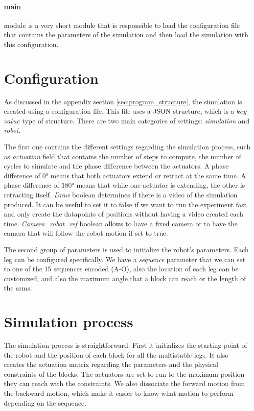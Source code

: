         \paragraph{main}
            module is a very short module that is responsible to load the configuration file that contains the parameters of the simulation and then load the simulation with this configuration.

    \section{Configuration}\label{sec:config}
        As discussed in the appendix section \ref{sec:program_structure}, the simulation is created using a configuration file. This file uses a JSON structure, which is a $key$ $value$ type of structure. There are two main categories of settings: \textit{simulation} and \textit{robot}. 
        
        The first one contains the different settings regarding the simulation process, such as \textit{actuation} field that contains the number of steps to compute, the number of cycles to simulate and the phase difference between the actuators. A phase difference of $0$° means that both actuators extend or retract at the same time. A phase difference of $180$° means that while one actuator is extending, the other is retracting itself. \textit{Draw} boolean determines if there is a video of the simulation produced. It can be useful to set it to false if we want to run the experiment fast and only create the datapoints of positions without having a video created each time. \textit{Camera\_robot\_ref} boolean allows to have a fixed camera or to have the camera that will follow the robot motion if set to true.
        
        The second group of parameters is used to initialize the robot's parameters. Each leg can be configured specifically. We have a \textit{sequence} parameter that we can set to one of the 15 sequences encoded (A-O), also the location of each leg can be customized, and also the maximum angle that a block can reach or the length of the arms.
        
    \section{Simulation process}
        The simulation process is straightforward. First it initializes the starting point of the robot and the position of each block for all the multistable legs. It also creates the actuation matrix regarding the parameters and the physical constraints of the blocks. The actuators are set to run to the maximum position they can reach with the constraints. We also dissociate the forward motion from the backward motion, which make it easier to know what motion to perform depending on the sequence.
        

